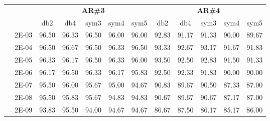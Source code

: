 \begin{table}[H]
\begin{tabular}{|c|c|c c c c c|c c c c c|}
\cline{3-12}
\multicolumn{2}{c}{} & \multicolumn{5}{|c|}{\textbf{AR\#3}}  & \multicolumn{5}{c|}{\textbf{AR\#4}} \\\cline{3-12}
\multicolumn{2}{c}{}  & \multicolumn{1}{|c}{db2} & db4 & sym3 & sym4 & sym5 & db2 & db4& sym3 & sym4 & sym5 \\\hline
\multicolumn{1}{|c|}{ \multirow{6}{*}{\rotatebox[origin=c]{90}{\textbf{Gamma}}} }
&2E-03&	96.50&	96.33 &	96.50 &	96.00 &	96.00&	92.83&	91.17&	91.33&	90.00&	89.67	\\\cline{2-12}
&2E-04&	96.50&	96.67 &	96.50 &	96.33 &	96.50&	93.33&	92.67&	93.17&	91.67&	91.83	\\\cline{2-12}
&2E-05&	96.33&	96.17 &	96.50 &	96.33 &	96.00&	93.50&	92.50&	92.83&	91.50&	91.33	\\\cline{2-12}
&2E-06&	96.17&	96.50 &	96.33 &	96.17 &	95.83&	92.50&	92.33&	91.83&	90.00&	90.00	\\\cline{2-12}
&2E-07&	95.50&	96.00 &	95.67 &	95.00 &	94.67&	90.83&	89.67&	90.50&	87.33&	87.00	\\\cline{2-12}
&2E-08&	95.50&	95.83 &	95.67 &	94.83 &	94.83&	90.67&	89.67&	90.67&	87.17&	87.00	\\\cline{2-12}
&2E-09&	93.83&	95.50 &	94.00 &	94.67 &	94.67&	86.67&	87.50&	86.17&	85.17&	86.00	

\\\midrule
\end{tabular}
\end{table}



















